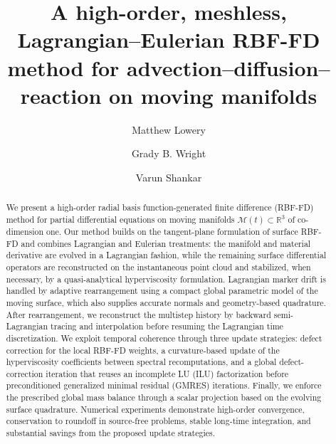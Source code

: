 \documentclass[a4paper,fleqn]{cas-sc}
\begin{document}
\let\WriteBookmarks\relax
\renewcommand{\floatpagefraction}{.7}
\def\textpagefraction{.001}


\title[mode=title]{A high-order, meshless, Lagrangian--Eulerian RBF-FD method for advection--diffusion--reaction on moving manifolds}
\tnotemark[1]

\author[1]{Matthew Lowery}

\author[2]{Grady B. Wright}

\author[1]{Varun Shankar}
\cormark[1]




\begin{abstract}
We present a high-order radial basis function-generated finite difference
(RBF-FD) method for partial differential equations on moving manifolds
$\mathcal M(t)\subset\mathbb R^3$ of co-dimension one. Our method builds on the tangent-plane
formulation of surface RBF-FD and combines Lagrangian and Eulerian treatments:
the manifold and material derivative are evolved in a Lagrangian fashion,
while the remaining surface differential operators are reconstructed on the
instantaneous point cloud and stabilized, when necessary, by a quasi-analytical
hyperviscosity formulation. Lagrangian marker drift is handled by adaptive
rearrangement using a compact global parametric model of the moving surface,
which also supplies accurate normals and geometry-based quadrature. After
rearrangement, we reconstruct the multistep history by backward
semi-Lagrangian tracing and interpolation before resuming the Lagrangian time
discretization. We exploit temporal coherence through three update strategies:
defect correction for the local RBF-FD weights, a curvature-based update of the
hyperviscosity coefficients between spectral recomputations, and a global
defect-correction iteration that reuses an incomplete LU (ILU) factorization
before preconditioned generalized minimal residual (GMRES) iterations. Finally, we enforce the prescribed global mass balance
through a scalar projection based on the evolving surface quadrature. Numerical
experiments demonstrate high-order convergence, conservation to roundoff in
source-free problems, stable long-time integration, and substantial savings
from the proposed update strategies.
\end{abstract}
\end{document}
